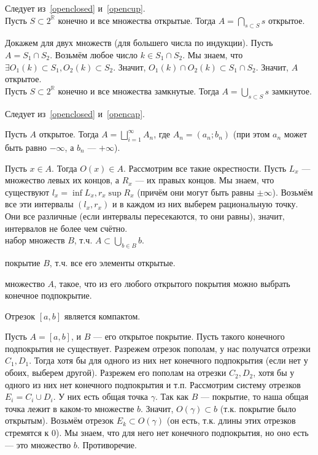 \documentclass[12pt,a4paper]{article}
\begin{document}
\proof Следует из~\ref{openclosed} и~\ref{opencup}.\QEDA\\

\lemma Пусть $S\subset 2^{\mathbb R}$ конечно и все множества открытые. Тогда $A=\bigcap_{s\subset S} s$ открытое.\label{opencap}

\proof Докажем для двух множеств (для большего числа по индукции). Пусть $A=S_1\cap S_2$. Возьмём любое число $k\in S_1\cap S_2$. Мы знаем, что $\exists O_1(k)\subset S_1,O_2(k)\subset S_2$. Значит, $O_1(k)\cap O_2(k)\subset S_1\cap S_2$. Значит, $A$ открытое.\QEDA\\

\lemma Пусть $S\subset 2^{\mathbb R}$ конечно и все множества замкнутые. Тогда $A=\bigcup_{s\subset S} s$ замкнутое.

\proof Следует из~\ref{openclosed} и~\ref{opencap}. \QEDA\\

\newpage

\theorem Пусть $A$ открытое. Тогда $A=\bigsqcup_{i=1}^\infty A_n$, где $A_n=(a_n;b_n)$ (при этом $a_n$ может быть равно $-\infty$, а $b_n$ --- $+\infty$).

\proof Пусть $x\in A$. Тогда $O(x)\in A$. Рассмотрим все такие окрестности. Пусть $L_x$ --- множество левых их концов, а $R_x$ --- их правых концов. Мы знаем, что существуют $l_x=\inf L_x,r_x\sup R_x$ (причём они могут быть равны $\pm\infty$). Возьмём все эти интервалы $(l_x,r_x)$ и в каждом из них выберем рациональную точку. Они все различные (если интервалы пересекаются, то они равны), значит, интервалов не более чем счётно.\QEDA\\

 набор множеств $B$, т.ч. $A\subset\bigcup_{b\in B} b$.

 покрытие $B$, т.ч. все его элементы открытые.

 множество $A$, такое, что из его любого открытого покрытия можно выбрать конечное подпокрытие.

 Отрезок $[a,b]$ является компактом.

\proof Пусть $A=[a,b]$, и $B$ --- его открытое покрытие. Пусть такого конечного подпокрытия не существует. Разрежем отрезок пополам, у нас получатся отрезки $C_1,D_1$. Тогда хотя бы для одного из них нет конечного подпокрытия (если нет у обоих, выберем другой). Разрежем его пополам на отрезки $C_2,D_2$, хотя бы у одного из них нет конечного подпокрытия и т.п. Рассмотрим систему отрезков $E_i=C_i\cup D_i$. У них есть общая точка $\gamma$. Так как $B$ --- покрытие, то наша общая точка лежит в каком-то множестве $b$. Значит, $O(\gamma)\subset b$ (т.к. покрытие было открытым). Возьмём отрезок $E_k\subset O(\gamma)$ (он есть, т.к. длины этих отрезков стремятся к 0). Мы знаем, что для него нет конечного подпокрытия, но оно есть --- это множество $b$. Противоречие.\QEDA\\
\end{document}
